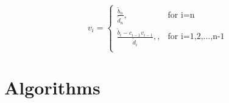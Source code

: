 \documentclass[%
oneside,                 %
final,                   %
10pt]{article}
\begin{document}
\begin{equation}
   v_i =
  \begin{cases}
                                  \frac{\tilde{b}_n}{\tilde{d}_n} ,  & \text{for i=n}\\
                \frac{\tilde{b}_i-c_{i-1} v_{i-1}}{\tilde{d}_i}, , & \text{for i=1,2,...,n-1}                    \\

  \end{cases}
\label{eq:v_i}
\end{equation}

\section{Algorithms}
\cite{armadillo}
\label{sec:M.Algo}



\end{document}
